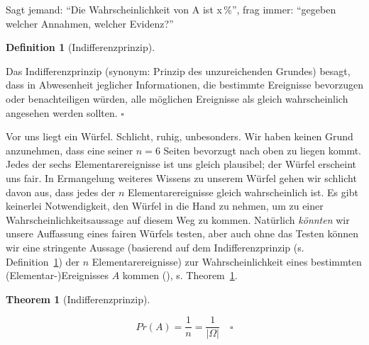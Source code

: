 \documentclass[
  ngerman,
  letterpaper,
  twoside,
  open=any]{scrbook}
\theoremstyle{definition}
\theoremstyle{plain}
\newtheorem{theorem}{Theorem}[chapter]
\theoremstyle{definition}
\theoremstyle{definition}
\newtheorem{definition}{Definition}[chapter]
\theoremstyle{definition}
\theoremstyle{definition}
\theoremstyle{remark}
\begin{document}
\begin{tcolorbox}[enhanced jigsaw, arc=.35mm, bottomrule=.15mm, bottomtitle=1mm, breakable, colback=white, colbacktitle=quarto-callout-note-color!10!white, colframe=quarto-callout-note-color-frame, coltitle=black, left=2mm, leftrule=.75mm, opacityback=0, opacitybacktitle=0.6, rightrule=.15mm, title=\textcolor{quarto-callout-note-color}{\faInfo}\hspace{0.5em}{Hinweis}, titlerule=0mm, toprule=.15mm, toptitle=1mm]

Sagt jemand: \enquote{Die Wahrscheinlichkeit von A ist x\,\%}, frag
immer: \enquote{gegeben welcher Annahmen, welcher Evidenz?}

\end{tcolorbox}

\begin{definition}[Indifferenzprinzip]\protect\hypertarget{def-indifferenzprinzip}{}\label{def-indifferenzprinzip}

Das Indifferenzprinzip (synonym: Prinzip des unzureichenden Grundes)
besagt, dass in Abwesenheit jeglicher Informationen, die bestimmte
Ereignisse bevorzugen oder benachteiligen würden, alle möglichen
Ereignisse als gleich wahrscheinlich angesehen werden sollten.
\(\square\)

\end{definition}

Vor uns liegt ein Würfel. Schlicht, ruhig, unbesonders. Wir haben keinen
Grund anzunehmen, dass eine seiner \(n=6\) Seiten bevorzugt nach oben zu
liegen kommt. Jedes der sechs Elementarereignisse ist uns gleich
plausibel; der Würfel erscheint uns fair. In Ermangelung weiteres
Wissens zu unserem Würfel gehen wir schlicht davon aus, dass jedes der
\(n\) Elementarereignisse gleich wahrscheinlich ist. Es gibt keinerlei
Notwendigkeit, den Würfel in die Hand zu nehmen, um zu einer
Wahrscheinlichkeitsaussage auf diesem Weg zu kommen. Natürlich
\emph{könnten} wir unsere Auffassung eines fairen Würfels testen, aber
auch ohne das Testen können wir eine stringente Aussage (basierend auf
dem Indifferenzprinzip (s. Definition~\ref{def-indifferenzprinzip}) der
\(n\) Elementarereignisse) zur Wahrscheinlichkeit eines bestimmten
(Elementar-)Ereignisses \(A\) kommen (), s. Theorem~\ref{thm-briggs}.

\begin{theorem}[Indifferenzprinzip]\protect\hypertarget{thm-briggs}{}\label{thm-briggs}

\[Pr(A) = \frac{1}{n}= \frac{1}{|\Omega|} \quad \square\]

\end{theorem}
\end{document}
